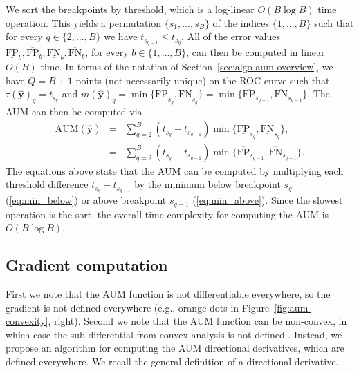 \documentclass{article}
\begin{document}
We sort the breakpoints by threshold, which is a log-linear $O(B\log B)$ time operation.
This yields a permutation $\{s_1,\dots, s_B\}$ of the indices $\{1,\dots,B\}$ such that for every $q\in\{2,\dots,B\}$ we have $t_{s_{q-1}} \leq  t_{s_q}$.
All of the error values $\underline{\text{FP}}_b,\overline{\text{FP}}_b,\underline{\text{FN}}_b,\overline{\text{FN}}_b$, for every $b\in\{1,\dots,B\}$, can then be computed in linear $O(B)$ time.
In terms of the notation of Section~\ref{sec:algo-aum-overview}, we have $Q=B+1$ points (not necessarily unique) on the ROC curve such that $\tau(\mathbf {\hat y})_{q} = t_{s_q}$ and $m(\mathbf {\hat y})_q = \min\{
    \underline{\text{FP}}_{s_q}, 
    \underline{\text{FN}}_{s_q}
    \} = \min\{
    \overline{\text{FP}}_{s_{q-1}}, 
    \overline{\text{FN}}_{s_{q-1}}
    \}$.
The AUM can then be computed via 
\begin{eqnarray}
    \text{AUM}(\mathbf{\hat y}) &=& 
    \sum_{q=2}^B 
    (t_{s_q} - t_{s_{q-1}}) 
    \min\{
    \underline{\text{FP}}_{s_q}, 
    \underline{\text{FN}}_{s_q}\label{eq:min_below}
    \}, \\
    &=& 
    \sum_{q=2}^B 
    (t_{s_q} - t_{s_{q-1}}) 
    \min\{
    \overline{\text{FP}}_{s_{q-1}}, 
    \overline{\text{FN}}_{s_{q-1}}\label{eq:min_above}
    \}. 
\end{eqnarray}
The equations above state that the AUM can be computed by multiplying each threshold difference $t_{s_q} - t_{s_{q-1}}$ by the minimum below breakpoint $s_q$ (\ref{eq:min_below}) or above breakpoint $s_{q-1}$ (\ref{eq:min_above}). 
Since the slowest operation is the sort, the overall time complexity for computing the AUM is $O(B\log B)$.

\subsection{Gradient computation}
\label{sec:gradient-computation}

First we note that the AUM function is not differentiable everywhere, so the gradient is not defined everywhere (e.g., orange dots in Figure~\ref{fig:aum-convexity}, right).
Second we note that the AUM function can be non-convex, in which case the sub-differential from convex analysis is not defined \citep{rockafellar-1970a}.
Instead, we propose an algorithm for computing the AUM directional derivatives, which are defined everywhere. 
We recall the general definition of a directional derivative.
\end{document}
